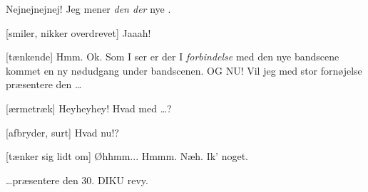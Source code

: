 \documentclass[a4paper,11pt]{article}
\begin{document}
\begin{sketch}
   Nejnejnejnej! Jeg mener {\it den der} nye .
  
   
  
  [smiler, nikker overdrevet] Jaaah!
  
  [tænkende] Hmm. Ok.  Som I ser er der
   I {\it forbindelse} med den nye bandscene
   kommet en ny nødudgang under bandscenen.
   OG NU! Vil jeg med stor
  fornøjelse præsentere den \ldots
  
  [ærmetræk] Heyheyhey! Hvad med \ldots?
  
  [afbryder, surt] Hvad nu!?
  
  [tænker sig lidt om] Øhhmm... Hmmm. Næh. Ik' noget.
  
   
  \ldots præsentere den 30. DIKU revy.
  

\end{sketch}
\end{document}
